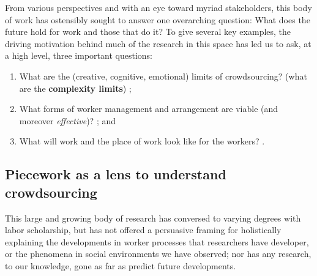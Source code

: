 \documentclass[trackingWork]{subfiles}
\begin{document}
From various perspectives and with an eye toward myriad stakeholders,
this body of work has ostensibly sought to answer one overarching question:
What does the future hold for work and those that do it? %
To give several key examples,
the driving motivation behind much of the research in this space has led us to ask,
at a high level, three important questions:
\begin{enumerate}
  \item What are the (creative, cognitive, emotional) limits of crowdsourcing? (what are the \textbf{complexity limits})  
    \cite{foundry,suzukiAtelier,KimStoria,yuanAlmost,YuEncouragingOutside,embracingErrorKrishna,Nebeling:2016:WCW:2858036.2858169,Hahn:2016:KAB:2858036.2858364};
  \item What forms of worker management and arrangement are viable (and moreover \textit{effective})?
    \cite{bernsteinSoylent,sensitiveTasks,LykourentzouPersonalityMatters,KucherbaevReLauncher,Law:2016:CKC:2858036.2858144,Cai:2016:CRI:2858036.2858237,Chang:2016:ACC:2858036.2858411,Newell:2016:OMA:2858036.2858490}; and%
  \item What will work and the place of work look like for the workers?
    \cite{turkopticon,storiesIraniSilberman,dynamo,crowdcollab,whyWouldAnyoneBrewer,takingAHITMcInnis}.
\end{enumerate}










\subsection{Piecework as a lens to understand crowdsourcing}
This large and growing body of research has conversed
to varying degrees with labor scholarship,
but has not offered a persuasive framing for holistically explaining
the developments in worker processes that researchers have developer, or
the phenomena in social environments we have observed;
nor has any research, to our knowledge,
gone as far as predict future developments.
\end{document}
